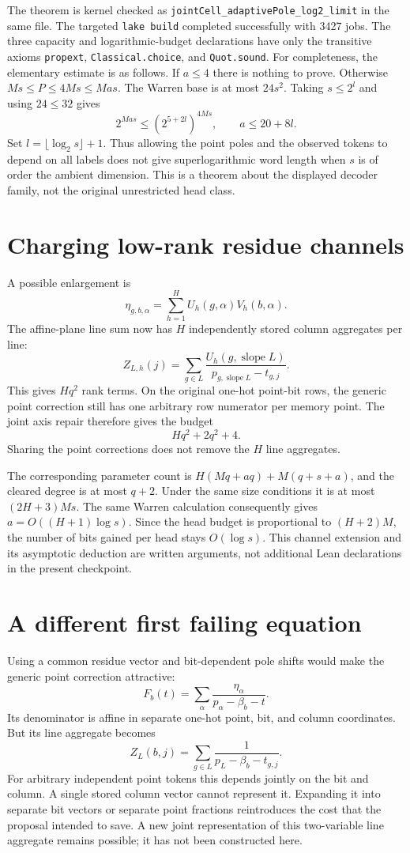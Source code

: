 \documentclass[11pt]{article}
\begin{document}
The theorem is kernel checked as
\texttt{jointCell\_adaptivePole\_log2\_limit} in the same file.
The targeted \texttt{lake build} completed successfully with 3427 jobs.
The three capacity and logarithmic-budget declarations have only the
transitive axioms \texttt{propext}, \texttt{Classical.choice}, and
\texttt{Quot.sound}.
For completeness, the elementary estimate is as follows. If $a\leq4$
there is nothing to prove. Otherwise
$Ms\leq P\leq4Ms\leq Mas$. The Warren base is at most $24s^2$.
Taking $s\leq2^l$ and using $24\leq32$ gives
\[
 2^{Mas}\leq (2^{5+2l})^{4Ms},
 \qquad a\leq20+8l.
\]
Set $l=\lfloor\log_2s\rfloor+1$. Thus allowing the point poles and
the observed tokens to depend on all labels does not give
superlogarithmic word length when $s$ is of order the ambient dimension.
This is a theorem about the displayed decoder family, not the original
unrestricted head class.

\section{Charging low-rank residue channels}

A possible enlargement is
\[
 \eta_{g,b,\alpha}=\sum_{h=1}^{H}
          U_h(g,\alpha)V_h(b,\alpha).
\]
The affine-plane line sum now has $H$ independently stored column
aggregates per line:
\[
 Z_{L,h}(j)=\sum_{g\in L}
       \frac{U_h(g,\operatorname{slope}L)}
            {p_{g,\operatorname{slope}L}-t_{g,j}}.
\]
This gives $Hq^2$ rank terms. On the original one-hot point-bit rows,
the generic point correction still has one arbitrary row numerator per
memory point. The joint axis repair therefore gives the budget
\[
 Hq^2+2q^2+4.
\]
Sharing the point corrections does not remove the $H$ line aggregates.

The corresponding parameter count is
$H(Mq+aq)+M(q+s+a)$, and the cleared degree is at most $q+2$.
Under the same size conditions it is at most $(2H+3)Ms$.
The same Warren calculation consequently gives
$a=O((H+1)\log s)$. Since the head budget is proportional to
$(H+2)M$, the number of bits gained per head stays $O(\log s)$.
This channel extension and its asymptotic deduction are written
arguments, not additional Lean declarations in the present checkpoint.

\section{A different first failing equation}

Using a common residue vector and bit-dependent pole shifts would make
the generic point correction attractive:
\[
 F_b(t)=\sum_\alpha\frac{\eta_\alpha}{p_\alpha-\beta_b-t}.
\]
Its denominator is affine in separate one-hot point, bit, and column
coordinates. But its line aggregate becomes
\[
 Z_L(b,j)=\sum_{g\in L}
               \frac1{p_L-\beta_b-t_{g,j}}.
\]
For arbitrary independent point tokens this depends jointly on the bit
and column. A single stored column vector cannot represent it. Expanding
it into separate bit vectors or separate point fractions reintroduces
the cost that the proposal intended to save. A new joint representation
of this two-variable line aggregate remains possible; it has not been
constructed here.
\end{document}
